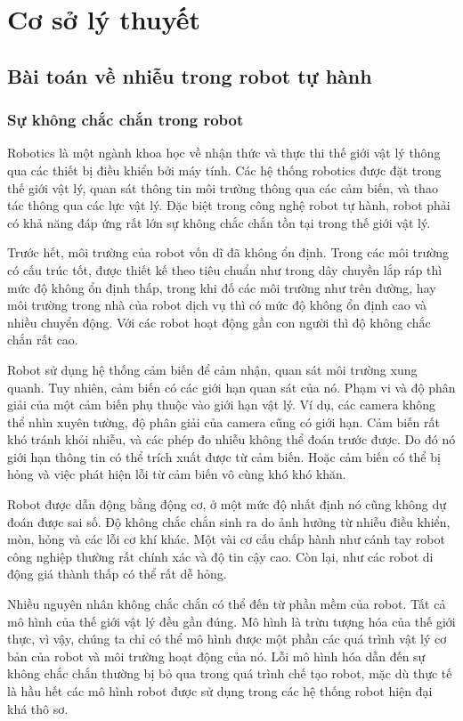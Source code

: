 \chapter{Cơ sở lý thuyết}
\label{chap:1cslt}
\section{Bài toán về nhiễu trong robot tự hành} \label{sec:2.1}
\subsection{Sự không chắc chắn trong robot}
Robotics là một ngành khoa học về nhận thức và thực thi thế giới vật lý thông qua các thiết bị điều khiển bởi máy tính. Các hệ thống robotics được đặt trong thế giới vật lý, quan sát thông tin môi trường thông qua các cảm biến, và thao tác thông qua các lực vật lý. Đặc biệt trong công nghệ robot tự hành, robot phải có khả năng đáp ứng rất lớn sự không chắc chắn tồn tại trong thế giới vật lý.

Trước hết, môi trường của robot vốn dĩ đã không ổn định. Trong các môi trường có cấu trúc tốt, được thiết kế theo tiêu chuẩn như trong dây chuyền lắp ráp thì mức độ không ổn định thấp, trong khi đố các môi trường như trên đường, hay môi trường trong nhà của robot dịch vụ thì có mức độ không ổn định cao và nhiều chuyển động. Với các robot hoạt động gần con người thì độ không chắc chắn rất cao.

Robot sử dụng hệ thống cảm biến để cảm nhận, quan sát môi trường xung quanh. Tuy nhiên, cảm biến có các giới hạn quan sát của nó. Phạm vi và độ phân giải của một cảm biến phụ thuộc vào giới hạn vật lý. Ví dụ, các camera không thể nhìn xuyên tường, độ phân giải của camera cũng có giới hạn. Cảm biến rất khó tránh khỏi nhiễu, và các phép đo nhiễu không thể đoán trước được. Do đó nó giới hạn thông tin có thể trích xuất được từ cảm biến. Hoặc cảm biến có thể bị hỏng và việc phát hiện lỗi từ cảm biến vô cùng khó khó khăn.

Robot được dẫn động bằng động cơ, ở một mức độ nhất định nó cũng không dự đoán được sai số. Độ không chắc chắn sinh ra do ảnh hưởng từ nhiễu điều khiển, mòn, hỏng và các lỗi cơ khí khác. Một vài cơ cấu chấp hành như cánh tay robot công nghiệp thường rất chính xác và độ tin cậy cao. Còn lại, như các robot di động giá thành thấp có thể rất dễ hỏng.

Nhiều nguyên nhân không chắc chắn có thể đến từ phần mềm của robot. Tất cả mô hình của thế giới vật lý đều gần đúng. Mô hình là trừu tượng hóa của thế giới thực, vì vậy, chúng ta chỉ có thể mô hình được một phần các quá trình vật lý cơ bản của robot và môi trường hoạt động của nó. Lỗi mô hình hóa dẫn đến sự không chắc chắn thường bị bỏ qua trong quá trình chế tạo robot, mặc dù thực tế là hầu hết các mô hình robot được sử dụng trong các hệ thống robot hiện đại khá thô sơ.

